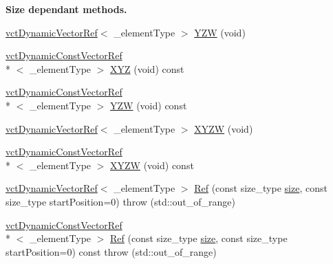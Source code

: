 \begin{Indent}{\bf Size dependant methods.}
\begin{DoxyCompactItemize}
\item 
\hyperlink{classvct_dynamic_vector_ref}{vct\-Dynamic\-Vector\-Ref}$<$ \-\_\-element\-Type $>$ \hyperlink{classvct_dynamic_vector_base_ad7aafd0663f3a997715ecaa20927192b}{Y\-Z\-W} (void)
\item 
\hyperlink{classvct_dynamic_const_vector_ref}{vct\-Dynamic\-Const\-Vector\-Ref}\\*
$<$ \-\_\-element\-Type $>$ \hyperlink{classvct_dynamic_vector_base_ae9729a3797a319b7354c0a7de7728acc}{X\-Y\-Z} (void) const 
\item 
\hyperlink{classvct_dynamic_const_vector_ref}{vct\-Dynamic\-Const\-Vector\-Ref}\\*
$<$ \-\_\-element\-Type $>$ \hyperlink{classvct_dynamic_vector_base_ad0fa6ceb43b20c493d8e5b8c58e5914d}{Y\-Z\-W} (void) const 
\item 
\hyperlink{classvct_dynamic_vector_ref}{vct\-Dynamic\-Vector\-Ref}$<$ \-\_\-element\-Type $>$ \hyperlink{classvct_dynamic_vector_base_a039fd2542bf02f1f02d7ba5db6b6c5cf}{X\-Y\-Z\-W} (void)
\item 
\hyperlink{classvct_dynamic_const_vector_ref}{vct\-Dynamic\-Const\-Vector\-Ref}\\*
$<$ \-\_\-element\-Type $>$ \hyperlink{classvct_dynamic_vector_base_a0c8bf0dd9ff05cc3d77f9c0b1c309138}{X\-Y\-Z\-W} (void) const 
\item 
\hyperlink{classvct_dynamic_vector_ref}{vct\-Dynamic\-Vector\-Ref}$<$ \-\_\-element\-Type $>$ \hyperlink{classvct_dynamic_vector_base_a0d8b2fc533bc1375977feb9c3927c3d8}{Ref} (const size\-\_\-type \hyperlink{classvct_dynamic_const_vector_base_a79950d8cced7fd4e790d9ac2ca1c43a7}{size}, const size\-\_\-type start\-Position=0)  throw (std\-::out\-\_\-of\-\_\-range)
\item 
\hyperlink{classvct_dynamic_const_vector_ref}{vct\-Dynamic\-Const\-Vector\-Ref}\\*
$<$ \-\_\-element\-Type $>$ \hyperlink{classvct_dynamic_vector_base_ae6d6c1df81bc36a286d52bfb1b868ded}{Ref} (const size\-\_\-type \hyperlink{classvct_dynamic_const_vector_base_a79950d8cced7fd4e790d9ac2ca1c43a7}{size}, const size\-\_\-type start\-Position=0) const   throw (std\-::out\-\_\-of\-\_\-range)
\end{DoxyCompactItemize}
\end{Indent}

